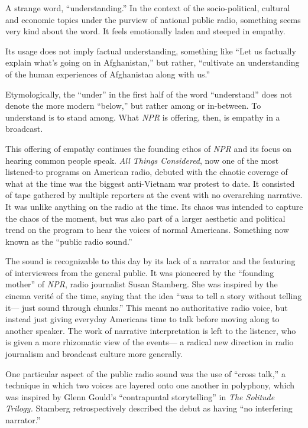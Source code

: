 \documentclass[12pt,letterpaper]{article}
\begin{document}
	A strange word, ``understanding.'' In the context of the 
	socio-political,
	cultural and economic topics under the purview of national public 
	radio, something seems very kind about the word. It feels emotionally
	laden and steeped in empathy. 

	Its usage does not imply factual understanding, something like ``Let
	us factually explain what's going on in Afghanistan,'' but rather, 
	``cultivate an understanding of the human experiences of Afghanistan 
	along with us.'' 


	Etymologically, the ``under'' in the first half of the word 
	``understand'' does not denote the more modern ``below,'' but rather 
	among or in-between. \autocite{Ety} To understand is to stand among. 
	What \textit{NPR} is offering, then, is empathy in a broadcast. 


	This offering of empathy continues the founding ethos of \textit{NPR} 
	and its focus on hearing common people speak. 
	\textit{All Things Considered}, now one of the most listened-to programs
	on American radio, debuted with the chaotic coverage of
	what at the time was the biggest anti-Vietnam war protest to date. It
	consisted of tape gathered by multiple reporters at the event with no 
	overarching narrative. It was unlike anything on the radio at the time.
	Its chaos was intended to capture the chaos of the moment, but was also
	part of a larger aesthetic and political trend on the program to hear 
	the voices of normal Americans. Something now known as the 
	``public radio sound.'' 

	The sound is recognizable to this day by its lack of a 
	narrator and the featuring of interviewees from the general public. It 
	was pioneered by the ``founding mother'' of \textit{NPR}, radio 
	journalist Susan Stamberg. She was inspired by the cinema verité of the
	time, saying that the idea ``was to tell a story without telling it---
	just sound through chunks.'' This meant no authoritative radio voice,
	but instead just giving everyday Americans time to talk before moving 
	along to another speaker. The work of narrative interpretation is left
	to the listener, who is given a more rhizomatic view of the events---
	a radical new direction in radio journalism and broadcast culture more
	generally.  

	One particular aspect of the public radio sound was the use of ``cross
	talk,'' a technique in which two voices are layered onto one another 	
	in polyphony, which was inspired by Glenn Gould's ``contrapuntal 
	storytelling'' in \textit{The Solitude Trilogy.}\autocite[197]{Porter}
	Stamberg retrospectively described the debut as having ``no interfering 
	narrator.''\autocite[185]{Porter}
\end{document}

